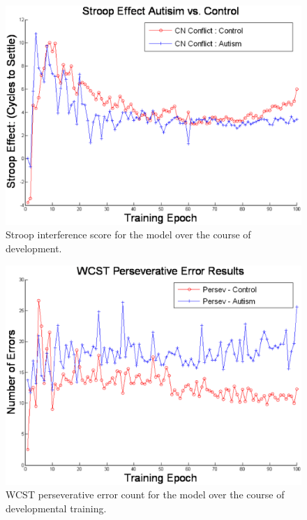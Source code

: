 \documentclass[man]{apa}
\begin{document}
\begin{figure}[t]
\begin{center}
	\includegraphics[width=145mm]{graphs/stroop_devel.eps}
\end{center}
\caption{Stroop interference score for the model over the course of development.} 
\label{stroop-devel-figure}
\end{figure} 

\begin{figure}[t]
\begin{center}
	\includegraphics[width=145mm]{graphs/wcst_devel_persev.eps}
\end{center}
\caption{WCST perseverative error count for the model over the course of developmental training.} 
\label{wcst-devel-figure}
\end{figure} 
\end{document}
